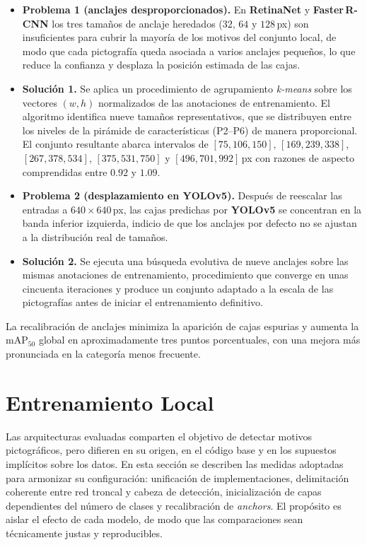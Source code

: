 \begin{itemize}
  \item \textbf{Problema 1 (anclajes desproporcionados).}
        En \textbf{RetinaNet} y \textbf{Faster\,R-CNN} los tres tamaños de anclaje heredados (\(32\), \(64\) y \(128\)\,px) son insuficientes para cubrir la mayoría de los motivos del conjunto local, de modo que cada pictografía queda asociada a varios anclajes pequeños, lo que reduce la confianza y desplaza la posición estimada de las cajas.

  \item \textbf{Solución 1.}
        Se aplica un procedimiento de agrupamiento \emph{k-means} sobre los vectores \((w,h)\) normalizados de las anotaciones de entrenamiento.
        El algoritmo identifica nueve tamaños representativos, que se distribuyen entre los niveles de la pirámide de características (P2–P6) de manera proporcional.
        El conjunto resultante abarca intervalos de \([75,106,150]\), \([169,239,338]\), \([267,378,534]\), \([375,531,750]\) y \([496,701,992]\)\,px con razones de aspecto comprendidas entre \(0.92\) y \(1.09\).

  \item \textbf{Problema 2 (desplazamiento en YOLOv5).}
        Después de reescalar las entradas a \(640\times640\)\,px, las cajas predichas por \textbf{YOLOv5} se concentran en la banda inferior izquierda, indicio de que los anclajes por defecto no se ajustan a la distribución real de tamaños.

  \item \textbf{Solución 2.}
        Se ejecuta una búsqueda evolutiva de nueve anclajes sobre las mismas anotaciones de entrenamiento, procedimiento que converge en unas cincuenta iteraciones y produce un conjunto adaptado a la escala de las pictografías antes de iniciar el entrenamiento definitivo.
\end{itemize}

La recalibración de anclajes minimiza la aparición de cajas espurias y aumenta la \(\text{mAP}_{50}\) global en aproximadamente tres puntos porcentuales, con una mejora más pronunciada en la categoría menos frecuente.

\section{Entrenamiento Local}\label{sec:entrenamiento_local}

Las arquitecturas evaluadas comparten el objetivo de detectar motivos pictográficos, pero difieren en su origen, en el código base y en los supuestos implícitos sobre los datos.
En esta sección se describen las medidas adoptadas para armonizar su configuración: unificación de implementaciones, delimitación coherente entre red troncal y cabeza de detección, inicialización de capas dependientes del número de clases y recalibración de \emph{anchors}.
El propósito es aislar el efecto de cada modelo, de modo que las comparaciones sean técnicamente justas y reproducibles.

